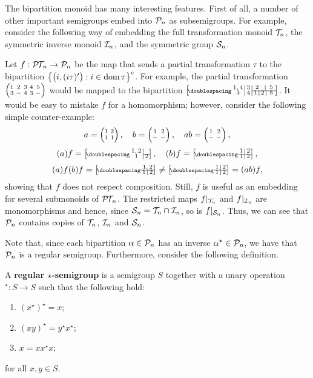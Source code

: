 The bipartition monoid has many interesting features.  First of all, a number of
other important semigroups embed into $\mathcal{P}_n$ as subsemigroups.  For example,
consider the following way of embedding the full transformation monoid $\mathcal{T}_n$,
the symmetric inverse monoid $\mathcal{I}_n$, and the symmetric group $\mathcal{S}_n$.

\begin{example}
  \label{ex:ptn-to-pn}
  Let $f : \mathcal{P\!T\!}_n \to \mathcal{P}_n$ be the map that sends a partial transformation
  $\tau$ to the bipartition
  $\left\{\big(i, (i\tau)'\big) : i \in \operatorname{dom} \tau\right\}^e$.  For example, the
  partial transformation $\transV3-43-$ would be mapped to the bipartition
  $\bipart{c|c|c|c|c}{3-5}{1,4 & 3 & \two{2}{5}}{3 & 4 & 1 & 2 & 5}$.  It would
  be easy to mistake $f$ for a homomorphism; however, consider the following
  simple counter-example:
  $$a = \transII11, \quad b = \transII--,\quad ab = \transII--,$$
  $$(a)f = \bipart{c|c}{2-2}{1,2 &}{1 & 2},\quad
  (b)f = \bipart{c|c}{1-2}{1 & 2}{1 & 2},$$
  $$(a)f(b)f = \bipart{c|c}{1-2}{\mc2{c}{1,2}}{1 & 2} \neq
  \bipart{c|c}{1-2}{1 & 2}{1 & 2} = (ab)f,$$
  showing that $f$ does not respect composition.  Still, $f$ is useful as an
  embedding for several submonoids of $\mathcal{P\!T\!}_n$.  The restricted maps $f|_{\mathcal{T}_n}$
  and $f|_{\mathcal{I}_n}$ are monomorphisms \cite[\S3.1--3.2]{east_2011} and hence,
  since $\mathcal{S}_n = \mathcal{T}_n \cap \mathcal{I}_n$, so is $f|_{\mathcal{S}_n}$.  Thus, we can see that
  $\mathcal{P}_n$ contains copies of $\mathcal{T}_n$, $\mathcal{I}_n$ and $\mathcal{S}_n$.
\end{example}

Note that, since each bipartition $\alpha \in \mathcal{P}_n$ has an inverse
$\alpha^\star \in \mathcal{P}_n$, we have that $\mathcal{P}_n$ is a regular semigroup.
Furthermore, consider the following definition.

\begin{definition}
  \label{def:regular-star-semigroup}
  A \textbf{regular $\star$-semigroup} is a semigroup $S$ together with a unary
  operation $^\star: S \to S$ such that the following hold:
  \begin{enumerate}[\rm(i)]
  \item $(x^\star)^\star = x$;
  \item $(xy)^\star = y^\star x^\star$;
  \item $x = x x^\star x$;
  \end{enumerate}
  for all $x, y \in S$.
\end{definition}

